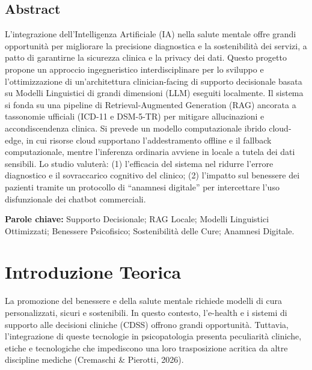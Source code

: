 \documentclass[11pt,a4paper]{article}
\begin{document}
\subsection*{Abstract}
L'integrazione dell'Intelligenza Artificiale (IA) nella salute mentale offre grandi opportunità per migliorare la precisione diagnostica e la sostenibilità dei servizi, a patto di garantirne la sicurezza clinica e la privacy dei dati. Questo progetto propone un approccio ingegneristico interdisciplinare per lo sviluppo e l'ottimizzazione di un'architettura clinician-facing di supporto decisionale basata su Modelli Linguistici di grandi dimensioni (LLM) eseguiti localmente. Il sistema si fonda su una pipeline di Retrieval-Augmented Generation (RAG) ancorata a tassonomie ufficiali (ICD-11 e DSM-5-TR) per mitigare allucinazioni e accondiscendenza clinica. Si prevede un modello computazionale ibrido cloud-edge, in cui risorse cloud supportano l'addestramento offline e il fallback computazionale, mentre l'inferenza ordinaria avviene in locale a tutela dei dati sensibili. Lo studio valuterà: (1) l'efficacia del sistema nel ridurre l'errore diagnostico e il sovraccarico cognitivo del clinico; (2) l'impatto sul benessere dei pazienti tramite un protocollo di ``anamnesi digitale'' per intercettare l'uso disfunzionale dei chatbot commerciali.

\vspace{0.4cm}
\noindent \textbf{Parole chiave:} Supporto Decisionale; RAG Locale; Modelli Linguistici Ottimizzati; Benessere Psicofisico; Sostenibilità delle Cure; Anamnesi Digitale.

\newpage

\section{Introduzione Teorica}

La promozione del benessere e della salute mentale richiede modelli di cura personalizzati, sicuri e sostenibili. In questo contesto, l'e-health e i sistemi di supporto alle decisioni cliniche (CDSS) offrono grandi opportunità. Tuttavia, l'integrazione di queste tecnologie in psicopatologia presenta peculiarità cliniche, etiche e tecnologiche che impediscono una loro trasposizione acritica da altre discipline mediche (Cremaschi \& Pierotti, 2026).
\end{document}

